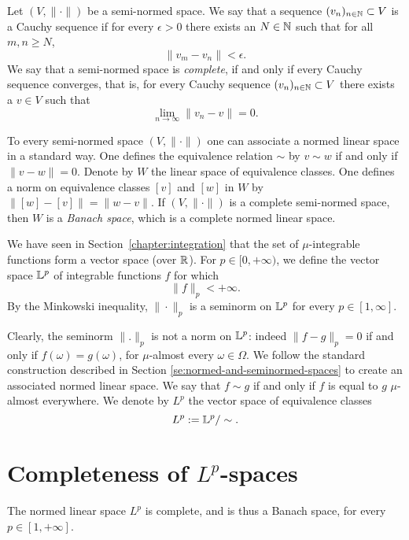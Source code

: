 \medskip

Let $(V, \|\cdot \|)$ be a semi-normed space. We say that a sequence $(v_n)_{n\in\mathbb N} \subset V$ is a Cauchy sequence if for every $\epsilon > 0$ there exists an $N \in \mathbb N$ such that for all $m, n \geq N$,
\[
\| v_m - v_n \| < \epsilon.
\]
We say that a semi-normed space is \emph{complete}, if and only if every Cauchy sequence converges, that is, for every Cauchy sequence $(v_n)_{n\in\mathbb N} \subset V$ there exists a $v \in V$ such that
\[
\lim_{n \to \infty} \|v_n - v\| = 0.
\]

To every semi-normed space $(V, \|\cdot\|)$ one can associate a normed linear space in a standard way. 
One defines the equivalence relation $\sim$ by $v \sim w$ if and only if $\|v - w\| = 0$. Denote by $W$ the linear space of equivalence classes. One defines a norm on equivalence classes $[v]$ and $[w]$ in $W$ by $\|[w]-[v]\| = \|w - v\|$. If $(V, \|\cdot\|)$ is a complete semi-normed space, then $W$ is a \emph{Banach space}, which is a complete normed linear space.

\medskip

We have seen in Section~\ref{chapter:integration} that the set of $\mu$-integrable functions form a vector space (over $\mathbb R$). For $p \in [0,+\infty)$, we define the vector space $\mathbb L^p$ of integrable functions $f$ for which 
\[
	\| f \|_{p} < +\infty.
\]
By the Minkowski inequality, $\|\cdot\|_{p}$ is a seminorm on $\mathbb L^p$ for every $p \in [1,\infty]$.

Clearly, the seminorm $\|. \|_p$ is not a norm on $\mathbb L^p$: indeed $\|f - g\|_p=0$ if and only if $f(\omega) = g(\omega)$, for $\mu$-almost every $\omega \in \Omega$. 
We follow the standard construction described in Section \ref{se:normed-and-seminormed-spaces} to create an associated normed linear space. We say that $f \sim g$ if and only if $f$ is equal to $g$ $\mu$-almost everywhere. 
We denote by $L^p$ the vector space of equivalence classes
\[
L^p := \mathbb L^p/\sim.
\]

\section{Completeness of $L^p$-spaces}

\begin{theorem}
The normed linear space $L^p$ is complete, and is thus a Banach space, for every $p \in [1,+\infty]$.	
\end{theorem}

